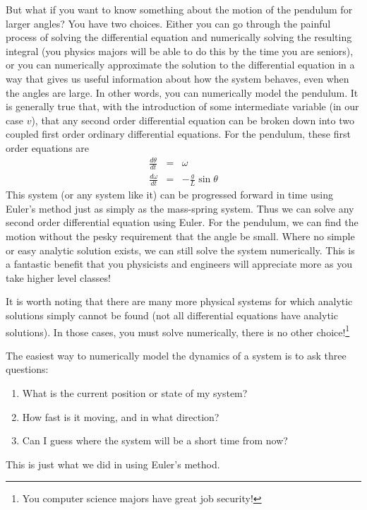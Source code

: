 \documentclass[twoside,11pt,ShortChapTitles]{BYUTextbook}
\begin{document}
But what if you want to know something about the motion of the pendulum for
larger angles? You have two choices. Either you can go through the painful
process of solving the differential equation and numerically solving the
resulting integral (you physics majors will be able to do this by the time
you are seniors), or you can numerically approximate the solution to the
differential equation in a way that gives us useful information about how
the system behaves, even when the angles are large. In other words, you can
numerically model the pendulum. It is generally true that, with the
introduction of some intermediate variable (in our case $v$), that any
second order differential equation can be broken down into two coupled first
order ordinary differential equations. For the pendulum, these first order
equations are 
\begin{eqnarray*}
\frac{d\theta }{dt} &=&\omega \\
\frac{d\omega }{dt} &=&-\frac{g}{L}\sin \theta
\end{eqnarray*}%
This system (or any system like it) can be progressed forward in time using
Euler's method just as simply as the mass-spring system. Thus we can solve
any second order differential equation using Euler. For the pendulum, we can
find the motion without the pesky requirement that the angle be small. Where
no simple or easy analytic solution exists, we can still solve the system
numerically. This is a fantastic benefit that you physicists and engineers
will appreciate more as you take higher level classes!

It is worth noting that there are many more physical systems for which
analytic solutions simply cannot be found (not all differential equations
have analytic solutions). In those cases, you must solve numerically, there
is no other choice!\footnote{%
You computer science majors have great job security!}

The easiest way to numerically model the dynamics of a system is to ask
three questions:

\begin{enumerate}
\item What is the current position or state of my system?

\item How fast is it moving, and in what direction?

\item Can I guess where the system will be a short time from now?
\end{enumerate}

This is just what we did in using Euler's method.
\end{document}
